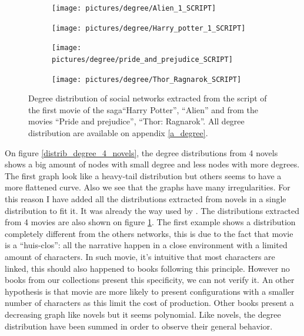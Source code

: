 \documentclass[a4paper, 12pt]{report}
\begin{document}
\begin{figure}
\begin{subfigure}{.49\textwidth}
\centering
\texttt{[image: pictures/degree/Alien\_1\_SCRIPT]}
\end{subfigure}
\hfill
\begin{subfigure}{.49\textwidth}
\centering
\texttt{[image: pictures/degree/Harry\_potter\_1\_SCRIPT]}
\end{subfigure}
\hfill
\begin{subfigure}{.49\textwidth}
\centering
\texttt{[image: pictures/degree/pride\_and\_prejudice\_SCRIPT]}
\end{subfigure}
\begin{subfigure}{.49\textwidth}
\centering
\texttt{[image: pictures/degree/Thor\_Ragnarok\_SCRIPT]}
\end{subfigure}
\caption{Degree distribution of social networks extracted from the script of the first movie of the saga``Harry Potter'', ``Alien'' and from the movies ``Pride and prejudice'', ``Thor: Ragnarok''. All degree distribution are available on appendix \ref{a_degree}.}
\label{distrib_degree_4_scripts}
\end{figure}

On figure \ref{distrib_degree_4_novels}, the degree distributions from 4 novels shows a big amount of nodes with small degree and less nodes with more degrees. The first graph look like a heavy-tail distribution but others seems to have a more flattened curve. Also we see that the graphs have many irregularities. For this reason I have added all the distributions extracted from novels in a single distribution to fit it. It was already the way used by \cite{original}.
The distributions extracted from 4 movies are also shown on figure \ref{distrib_degree_4_scripts}. The first example shows a distribution completely different from the others networks, this is due to the fact that movie is a ``huis-clos'': all the narrative happen in a close environment with a limited amount of characters. In such movie, it's intuitive that most characters are linked, this should also happened to books following this principle. However no books from our collections present this specificity, we can not verify it. An other hypothesis is that movie are more likely to present configurations with a smaller number of characters as this limit the cost of production. Other books present a decreasing graph like novels but it seems polynomial. Like novels, the degree distribution have been summed in order to observe their general behavior. \\
\end{document}
